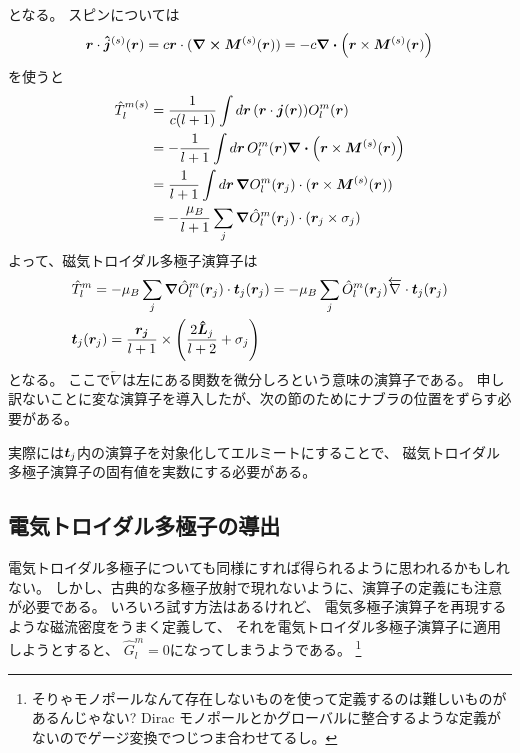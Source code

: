 \documentclass[../master.tex]{subfiles}
\begin{document}
となる。
スピンについては
\begin{equation}
    \vb*{r}\cdot \vb*{\hat{j}}^{(s)}(\vb*{r}) = c\vb*{r}\cdot(\curl \vb*{M}^{(s)}(\vb*{r})) = -c\div(\vb*{r}\times \vb*{M}^{(s)}(\vb*{r}))
\end{equation}
を使うと
\begin{align}
    \hat{T}_l^{m(s)}
    &= \frac{1}{c(l+1)} \int d\vb*{r}\, (\vb*{r}\cdot\vb*{j}(\vb*{r}))O_l^m(\vb*{r})\\
    &= -\frac{1}{l+1} \int d\vb*{r}\, O_l^m(\vb*{r}) \div(\vb*{r}\times \vb*{M}^{(s)}(\vb*{r}))\\
    &= \frac{1}{l+1} \int d\vb*{r}\, \grad O_l^m(\vb*{r}_j) \cdot (\vb*{r}\times \vb*{M}^{(s)}(\vb*{r})) \\
    &= -\frac{\mu_B}{l+1}\sum_j \grad \hat{O}_l^m(\vb*{r}_j)\cdot (\vb*{r}_j \times \sigma_j)
\end{align}
よって、磁気トロイダル多極子演算子は
\begin{align}
    &\hat{T}_l^m = -\mu_B \sum_j  \grad \hat{O}_l^m(\vb*{r}_j) \cdot \vb*{t}_j(\vb*{r}_j)
    = -\mu_B \sum_j   \hat{O}_l^m(\vb*{r}_j)  \overleftarrow{\nabla} \cdot \vb*{t}_j(\vb*{r}_j)\\
    &\vb*{t}_j(\vb*{r}_j) = \frac{\vb*{r_j}}{l+1} \times \qty(\frac{2\vb*{\hat{L}}_j}{l+2}+\sigma_j)
\end{align}
となる。
ここで\(\overleftarrow{\nabla}\)は左にある関数を微分しろという意味の演算子である。
申し訳ないことに変な演算子を導入したが、次の節のためにナブラの位置をずらす必要がある。

実際には\(\vb*{t}_j\)内の演算子を対象化してエルミートにすることで、
磁気トロイダル多極子演算子の固有値を実数にする必要がある。

\subsection*{電気トロイダル多極子の導出}
電気トロイダル多極子についても同様にすれば得られるように思われるかもしれない。
しかし、古典的な多極子放射で現れないように、演算子の定義にも注意が必要である。
いろいろ試す方法はあるけれど、
電気多極子演算子を再現するような磁流密度をうまく定義して、
それを電気トロイダル多極子演算子に適用しようとすると、
\(\hat{G}_l^m=0\)になってしまうようである。
\footnote{そりゃモノポールなんて存在しないものを使って定義するのは難しいものがあるんじゃない?
Dirac モノポールとかグローバルに整合するような定義がないのでゲージ変換でつじつま合わせてるし。}
\end{document}
